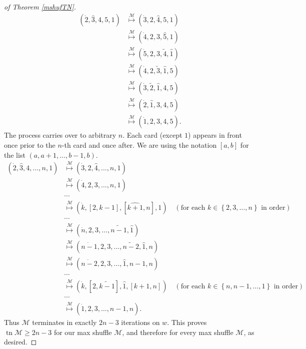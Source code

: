 \documentclass[10pt,a4paper]{amsart}
\newcommand{\M}{\mathcal{M}} %
\newcommand{\set}[1]{\left\{ #1 \right\}}
\newcommand{\tn}{\operatorname{tn }} %
\newcommand{\tup}[1]{\left( #1 \right)}
\begin{document}
\begin{proof}[of Theorem \ref{mshufTN}]
\begin{align*}
    \tup{\dot{2},\hat{3},4,5,1} &\overset{\M}{ \mapsto } \tup{\dot{3},2,\hat{4},5,1}\\
     &\overset{\M}{ \mapsto } \tup{\dot{4},2,3,\hat{5},1}\\
     &\overset{\M}{ \mapsto } \tup{\dot{5},2,3,\tilde{4},\hat{1}}\\
     &\overset{\M}{ \mapsto } \tup{\dot{4},2,\tilde{3},\hat{1},5}\\
     &\overset{\M}{ \mapsto } \tup{\dot{3},\tilde{2},\hat{1},4,5}\\
     &\overset{\M}{ \mapsto } \tup{\dot{2},\hat{1},3,4,5}\\
     &\overset{\M}{ \mapsto } \tup{\dot{1},2,3,4,5}.
\end{align*}
The process carries over to arbitrary $n$. Each card (except $1$) appears in front once prior to the $n$-th card and once after.
We are using the notation $[a,b]$ for the list $\tup{a,a+1,\ldots,b-1,b}$.
 \begin{align*}
        (\dot{2},\hat{3},4,\dots,n,1) &\overset{\M}{ \mapsto } (\dot{3},2,\hat{4},\dots,n,1)\\
                          &\overset{\M}{ \mapsto } (\dot{4},2,3,\dots,n,1)\\
                          & \cdots \\
                          &\overset{\M}{ \mapsto } (\dot{k},[2,k-1],[\hat{k+1},n],1) \quad\tup{\text{for each } k \in \set{2,3,\ldots,n} \text{ in order} }\\
                          & \cdots \\
                          &\overset{\M}{ \mapsto } (\dot{n},2,3,\dots,\tilde{n-1},\hat{1})\\
                          &\overset{\M}{ \mapsto } (\dot{n-1},2,3,\dots,\tilde{n-2},\hat{1},n)\\
                          &\overset{\M}{ \mapsto } (\dot{n-2},2,3,\dots,\hat{1},n-1,n)\\
                          & \cdots \\
                          &\overset{\M}{ \mapsto } (\dot{k},[2,\tilde{k-1}],\hat{1},[k+1,n]) \quad\tup{\text{for each } k \in \set{n,n-1,\ldots,1} \text{ in order}}\\
                          & \cdots \\
                          &\overset{\M}{ \mapsto } (\dot{1},2,3,\dots,n-1,n).
\end{align*}
Thus $\M$ terminates in exactly $2n-3$ iterations on $w$.
This proves $\tn \M \ge 2n-3$ for our max shuffle $\M$, and therefore for every max shuffle $\M$, as desired.
\end{proof}
\end{document}
